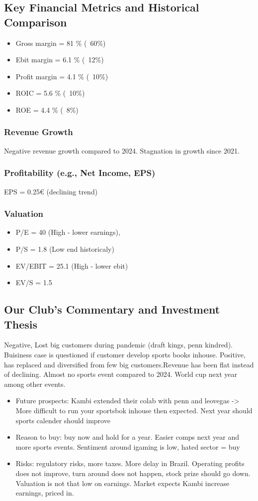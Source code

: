 \documentclass[a4paper, 11pt, oneside]{article} %
\begin{document}
\subsection{Key Financial Metrics and Historical Comparison}
\begin{itemize}
	\item Gross margin = 81 \% (~60\%)
	\item Ebit margin = 6.1 \% (~12\%)
	\item Profit margin = 4.1 \% (~10\%)
	\item ROIC = 5.6 \% (~10\%)
	\item ROE = 4.4 \% (~8\%)
\end{itemize}


\subsubsection{Revenue Growth}
Negative revenue growth compared to 2024. Stagnation in growth since 2021.

\subsubsection{Profitability (e.g., Net Income, EPS)}
EPS = 0.25€ (declining trend)

\subsubsection{Valuation}
\begin{itemize}
	\item P/E = 40 (High - lower earnings),
	\item P/S = 1.8 (Low end historicaly)
	\item EV/EBIT = 25.1 (High - lower ebit)
	\item EV/S = 1.5
\end{itemize}


\subsection{Our Club's Commentary and Investment Thesis}
Negative, Lost big customers during pandemic (draft kings, penn kindred). Buisiness case is questioned if customer develop sports books inhouse. Positive, has replaced and diversified from few big customers.Revenue has been flat instead of declining.
Almost no sports event compared to 2024. World cup next year among other events.
\begin{itemize}
	\item Future prospects: Kambi extended their colab with penn and leovegas -> More difficult to run your sportsbok inhouse then expected. Next year should sports calender should improve
	\item Reason to buy: buy now and hold for a year. Easier comps next year and more sports events. Sentiment around igaming is low, hated sector = buy
	\item Risks: regulatory risks, more taxes. More delay in Brazil. Operating profits does not improve, turn around does not happen, stock prize should go down. Valuation is not that low on earnings. Market expects Kambi increase earnings, priced in.
\end{itemize}
\end{document}
